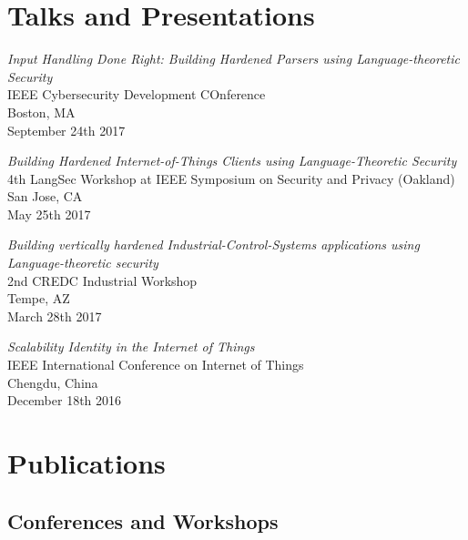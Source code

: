 \documentclass[letterpaper,10pt]{article}
\renewenvironment{itemize}{
  \begin{list}{}{
    \setlength{\leftmargin}{1.5em}
  }
}{
  \end{list}
}
\begin{document}
\section*{Talks and Presentations}
\begin{itemize}
\setlength\itemsep{0ex}
\item \textit{Input Handling Done Right: Building Hardened Parsers using Language-theoretic Security} \\ IEEE Cybersecurity Development COnference\\ Boston, MA\\ September 24th 2017
\item \textit{Building Hardened Internet-of-Things Clients using Language-Theoretic Security}\\ 4th LangSec Workshop at IEEE Symposium on Security and Privacy (Oakland)\\ San Jose, CA\\ May 25th 2017
\item \textit{Building vertically hardened Industrial-Control-Systems applications using Language-theoretic security}\\ 2nd CREDC Industrial Workshop\\ Tempe, AZ\\ March 28th 2017
\item \textit{Scalability Identity in the Internet of Things}\\ IEEE International Conference on Internet of Things\\ Chengdu, China\\ December 18th 2016
\end{itemize}

\section*{Publications}



\subsection*{Conferences and Workshops} %
\end{document}
